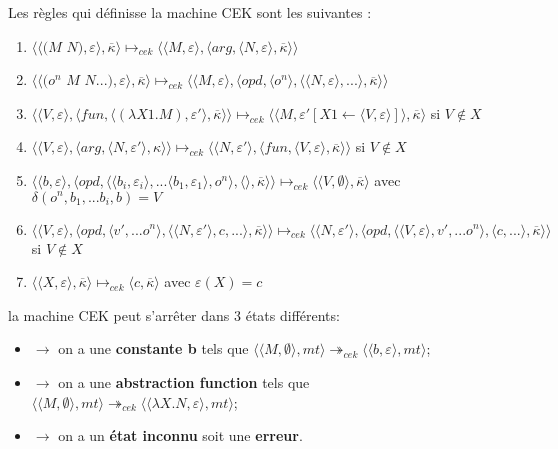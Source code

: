 \documentclass[10pt,a4paper]{article}
\begin{document}
			
			Les règles qui définisse la machine CEK sont les suivantes :
			\begin{enumerate}
				\item $\langle\langle(M$ $N),\varepsilon\rangle,\overline{\kappa}\rangle \longmapsto_{cek} \langle \langle M,\varepsilon\rangle,\langle arg,\langle N,\varepsilon\rangle,\overline{\kappa}\rangle\rangle$
				\item $\langle\langle(o^{n}$ $M$ $N...),\varepsilon\rangle,\overline{\kappa}\rangle \longmapsto_{cek} \langle \langle M,\varepsilon\rangle,\langle opd,\langle o^{n}\rangle,\langle \langle N,\varepsilon\rangle,...\rangle,\overline{\kappa}\rangle\rangle$
				\item $\langle\langle V,\varepsilon\rangle,\langle fun,\langle (\lambda X1.M),\varepsilon'\rangle,\overline{\kappa} \rangle \rangle \longmapsto_{cek} \langle \langle M,\varepsilon'[X1 \leftarrow \langle V,\varepsilon\rangle]\rangle,\overline{\kappa}\rangle$ si $V \notin X$
				\item  $\langle \langle V,\varepsilon\rangle,\langle arg,\langle N,\varepsilon'\rangle,\kappa\rangle\rangle \longmapsto_{cek} \langle \langle N,\varepsilon'\rangle,\langle fun,\langle V,\varepsilon\rangle,\overline{\kappa}\rangle\rangle$ si $V \notin X$
				\item $\langle  \langle b,\varepsilon\rangle,\langle opd,\langle \langle b_{i},\varepsilon_{i}\rangle,...\langle b_{1},\varepsilon_{1}\rangle ,o^{n}\rangle,\langle\rangle,\overline{\kappa}\rangle\rangle \longmapsto_{cek} \langle \langle V,\emptyset\rangle,\overline{\kappa}\rangle$ avec $\delta(o^{n},b_{1},...b_{i},b) = V$
				\item $\langle \langle V,\varepsilon\rangle,\langle opd,\langle v',...o^{n}\rangle,\langle  \langle N,\varepsilon'\rangle,c,...\rangle,\overline{\kappa}\rangle\rangle \longmapsto_{cek} \langle \langle N,\varepsilon'\rangle,\langle opd,\langle  \langle V,\varepsilon\rangle,v',...o^{n}\rangle,\langle c,...\rangle,\overline{\kappa}\rangle\rangle$ si $V \notin X$	
				\item $\langle\langle X,\varepsilon\rangle,\overline{\kappa}\rangle \longmapsto_{cek} \langle c,\overline{\kappa}\rangle$ avec $\varepsilon(X) = c$
				
			\end{enumerate}
			\bigbreak
			
			la machine CEK peut s'arrêter dans 3 états différents:
			\begin{itemize}
				\item[]$\longrightarrow$ on a une \textbf{constante b} tels que $\langle \langle M,\emptyset\rangle,mt\rangle \twoheadrightarrow_{cek} \langle\langle b,\varepsilon\rangle,mt\rangle$;
				\item[]$\longrightarrow$ on a une \textbf{abstraction function} tels que $\langle \langle M,\emptyset\rangle,mt\rangle \twoheadrightarrow_{cek} \langle\langle \lambda X.N,\varepsilon\rangle,mt\rangle$;
				\item[]$\longrightarrow$ on a un \textbf{état inconnu} soit une \textbf{erreur}.
			\end{itemize}
			\bigbreak
			
\end{document}
